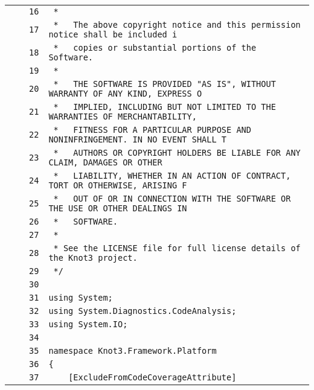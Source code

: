 \documentclass[a4paper,10pt]{article}
\begin{document}
\begin{longtable}[l]{lrrl}
\cellcolor{gray} &  & \verb~16~ & \verb~ *~\\
\cellcolor{gray} &  & \verb~17~ & \verb~ *   The above copyright notice and this permission notice shall be included i~\\
\cellcolor{gray} &  & \verb~18~ & \verb~ *   copies or substantial portions of the Software.~\\
\cellcolor{gray} &  & \verb~19~ & \verb~ *~\\
\cellcolor{gray} &  & \verb~20~ & \verb~ *   THE SOFTWARE IS PROVIDED "AS IS", WITHOUT WARRANTY OF ANY KIND, EXPRESS O~\\
\cellcolor{gray} &  & \verb~21~ & \verb~ *   IMPLIED, INCLUDING BUT NOT LIMITED TO THE WARRANTIES OF MERCHANTABILITY,~\\
\cellcolor{gray} &  & \verb~22~ & \verb~ *   FITNESS FOR A PARTICULAR PURPOSE AND NONINFRINGEMENT. IN NO EVENT SHALL T~\\
\cellcolor{gray} &  & \verb~23~ & \verb~ *   AUTHORS OR COPYRIGHT HOLDERS BE LIABLE FOR ANY CLAIM, DAMAGES OR OTHER~\\
\cellcolor{gray} &  & \verb~24~ & \verb~ *   LIABILITY, WHETHER IN AN ACTION OF CONTRACT, TORT OR OTHERWISE, ARISING F~\\
\cellcolor{gray} &  & \verb~25~ & \verb~ *   OUT OF OR IN CONNECTION WITH THE SOFTWARE OR THE USE OR OTHER DEALINGS IN~\\
\cellcolor{gray} &  & \verb~26~ & \verb~ *   SOFTWARE.~\\
\cellcolor{gray} &  & \verb~27~ & \verb~ *~\\
\cellcolor{gray} &  & \verb~28~ & \verb~ * See the LICENSE file for full license details of the Knot3 project.~\\
\cellcolor{gray} &  & \verb~29~ & \verb~ */~\\
\cellcolor{gray} &  & \verb~30~ & \verb~~\\
\cellcolor{gray} &  & \verb~31~ & \verb~using System;~\\
\cellcolor{gray} &  & \verb~32~ & \verb~using System.Diagnostics.CodeAnalysis;~\\
\cellcolor{gray} &  & \verb~33~ & \verb~using System.IO;~\\
\cellcolor{gray} &  & \verb~34~ & \verb~~\\
\cellcolor{gray} &  & \verb~35~ & \verb~namespace Knot3.Framework.Platform~\\
\cellcolor{gray} &  & \verb~36~ & \verb~{~\\
\cellcolor{gray} &  & \verb~37~ & \verb~    [ExcludeFromCodeCoverageAttribute]~\\

\end{longtable}
\end{document}
